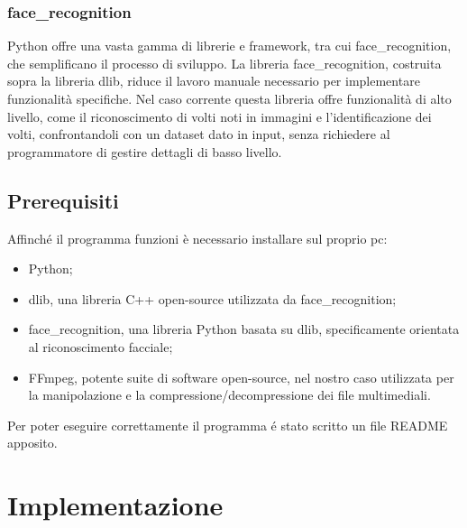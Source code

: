 \documentclass{report}
\begin{document}
\subsection{face\_recognition}
Python offre una vasta gamma di librerie e framework, tra cui face\_recognition, che semplificano il processo di sviluppo.
La libreria face\_recognition, costruita sopra la libreria dlib, riduce il lavoro manuale necessario per implementare funzionalità specifiche. Nel caso corrente questa libreria offre funzionalità di alto livello, come il riconoscimento di volti noti in immagini e l’identificazione dei volti, confrontandoli con un dataset dato in input, senza richiedere al programmatore di gestire dettagli di basso livello.

\section{Prerequisiti}
Affinché il programma funzioni è necessario installare sul proprio pc:
\begin{itemize}
    \item
    Python;
    \item
    dlib, una libreria C++ open-source utilizzata da face\_recognition;
    \item
    face\_recognition, una libreria Python basata su dlib, specificamente orientata al riconoscimento facciale;
    \item
    FFmpeg, potente suite di software open-source, nel nostro caso utilizzata per la manipolazione e la compressione/decompressione dei file multimediali.
    \end{itemize}
Per poter eseguire correttamente il programma é stato scritto un file README apposito.

\chapter{Implementazione}
\end{document}
